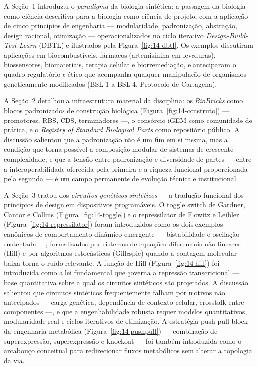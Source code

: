 A Seção~1 introduziu o \emph{paradigma} da biologia sintética: a passagem da biologia como ciência descritiva para a biologia como ciência de projeto, com a aplicação de cinco princípios de engenharia --- modularidade, padronização, abstração, design racional, otimização --- operacionalizados no ciclo iterativo \emph{Design-Build-Test-Learn} (DBTL) e ilustrados pela Figura~\ref{fig:14-dbtl}. Os exemplos discutiram aplicações em biocombustíveis, fármacos (artemisinina em leveduras), biossensores, biomateriais, terapia celular e biorremediação, e anteciparam o quadro regulatório e ético que acompanha qualquer manipulação de organismos geneticamente modificados (BSL-1 a BSL-4, Protocolo de Cartagena).

A Seção~2 detalhou a infraestrutura material da disciplina: os \emph{BioBricks} como blocos padronizados de construção biológica (Figura~\ref{fig:14-construto}) --- promotores, RBS, CDS, terminadores ---, o consórcio iGEM como comunidade de prática, e o \emph{Registry of Standard Biological Parts} como repositório público. A discussão salientou que a padronização não é um fim em si mesma, mas a condição que torna possível a composição modular de sistemas de crescente complexidade, e que a tensão entre padronização e diversidade de partes --- entre a interoperabilidade oferecida pela primeira e a riqueza funcional proporcionada pela segunda --- é um campo permanente de evolução técnica e institucional.

A Seção~3 tratou dos \emph{circuitos genéticos sintéticos} --- a tradução funcional dos princípios de design em dispositivos programáveis. O toggle switch de Gardner, Cantor e Collins (Figura~\ref{fig:14-toggle}) e o repressilator de Elowitz e Leibler (Figura~\ref{fig:14-repressilator}) foram introduzidos como os dois exemplos canônicos de comportamento dinâmico emergente --- bistabilidade e oscilação sustentada ---, formalizados por sistemas de equações diferenciais não-lineares (Hill) e por algoritmos estocásticos (Gillespie) quando a contagem molecular baixa torna o ruído relevante. A função de Hill (Figura~\ref{fig:14-hill}) foi introduzida como a lei fundamental que governa a repressão transcricional --- base quantitativa sobre a qual os circuitos sintéticos são projetados. A discussão salientou que circuitos sintéticos frequentemente falham por motivos não antecipados --- carga genética, dependência de contexto celular, crosstalk entre componentes ---, e que a engenhabilidade robusta requer modelos quantitativos, modularidade real e ciclos iterativos de otimização. A estratégia push-pull-block da engenharia metabólica (Figura~\ref{fig:14-pushpull}) --- combinação de superexpressão, superexpressão e knockout --- foi também introduzida como o arcabouço conceitual para redirecionar fluxos metabólicos sem alterar a topologia da via.

